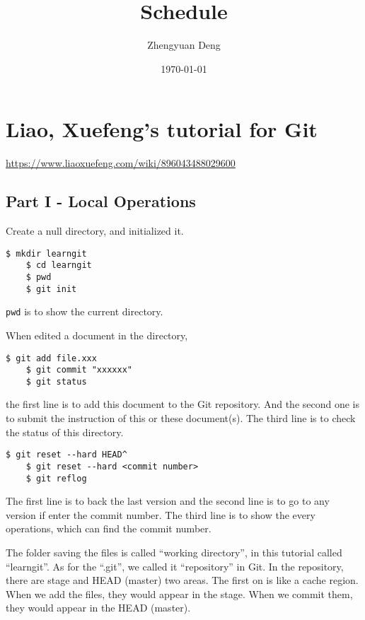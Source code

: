 \documentclass[11pt]{article}
\title{Schedule}
\author{Zhengyuan Deng}
\date{\today}
\begin{document}
\maketitle

\newpage
\tableofcontents
\section{Liao, Xuefeng's tutorial for Git}
\url{https://www.liaoxuefeng.com/wiki/896043488029600}
\subsection{Part I - Local Operations}
Create a null directory, and initialized it.
\begin{lstlisting}[basicstyle=\small\conso]
    $ mkdir learngit
    $ cd learngit
    $ pwd
    $ git init
\end{lstlisting}
\texttt{pwd} is to show the current directory.

When edited a document in the directory, 
\begin{lstlisting}[basicstyle=\small\conso]
    $ git add file.xxx
    $ git commit "xxxxxx"
    $ git status
\end{lstlisting}
the first line is to add this document to the Git repository. 
And the second one is to submit the instruction of this or these document(s). The third line is to check the status of this directory.

\begin{lstlisting}[basicstyle=\small\conso]
    $ git reset --hard HEAD^
    $ git reset --hard <commit number>
    $ git reflog
\end{lstlisting}
The first line is to back the last version and the second line is to go to any version if enter the commit number. 
The third line is to show the every operations, which can find the commit number.

The folder saving the files is called ``working directory'', in this tutorial called ``learngit''. 
As for the ``.git'', we called it ``repository'' in Git. 
In the repository, there are stage and HEAD (master) two areas. 
The first on is like a cache region. When we add the files, they would appear in the stage. 
When we commit them, they would appear in the HEAD (master).
\end{document}
